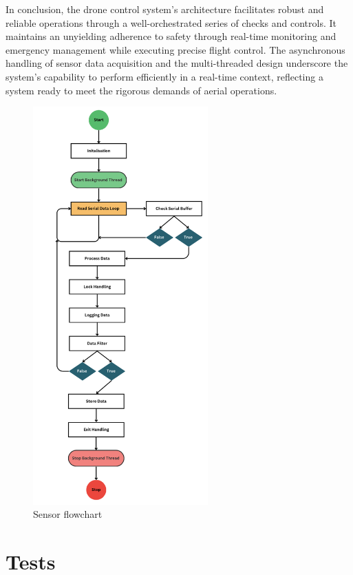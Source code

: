 \documentclass{article}
\begin{document}
In conclusion, the drone control system's architecture facilitates robust and reliable operations through a well-orchestrated series of checks and controls. It maintains an unyielding adherence to safety through real-time monitoring and emergency management while executing precise flight control. The asynchronous handling of 
sensor data acquisition and the multi-threaded design underscore the system's capability to perform efficiently in a real-time context, reflecting a system ready to meet the rigorous demands of aerial operations.
\begin{figure}[H]
  \centering
  \includegraphics[width=0.6\textwidth]{Pictures/sensor_flowchart.png}
  \caption{Sensor flowchart}
  \label{fig:Sensor_flowchart}
\end{figure}
\section{Tests}
\end{document}
